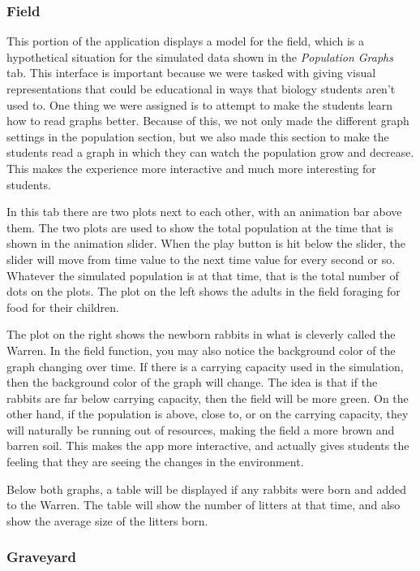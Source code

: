 \documentclass[titlepage]{article}\usepackage[]{graphicx}\usepackage[]{color}
\begin{document}
\subsubsection{Field}

This portion of the application displays a model for the field, which is a hypothetical situation for the simulated data shown in the \textit{Population Graphs} tab. This interface is important because we were tasked with giving visual representations that could be educational in ways that biology students aren't used to. One thing we were assigned is to attempt to make the students learn how to read graphs better. Because of this, we not only made the different graph settings in the population section, but we also made this section to make the students read a graph in which they can watch the population grow and decrease. This makes the experience more interactive and much more interesting for students.

In this tab there are two plots next to each other, with an animation bar above them. The two plots are used to show the total population at the time that is shown in the animation slider. When the play button is hit below the slider, the slider will move from time value to the next time value for every second or so. Whatever the simulated population is at that time, that is the total number of dots on the plots. The plot on the left shows the adults in the field foraging for food for their children. 

The plot on the right shows the newborn rabbits in what is cleverly called the Warren. In the field function, you may also notice the background color of the graph changing over time. If there is a carrying capacity used in the simulation, then the background color of the graph will change. The idea is that if the rabbits are far below carrying capacity, then the field will be more green. On the other hand, if the population is above, close to, or on the carrying capacity, they will naturally be running out of resources, making the field a more brown and barren soil. This makes the app more interactive, and actually gives students the feeling that they are seeing the changes in the environment. 

Below both graphs, a table will be displayed if any rabbits were born and added to the Warren. The table will show the number of litters at that time, and also show the average size of the litters born.


\subsubsection{Graveyard}
\end{document}
